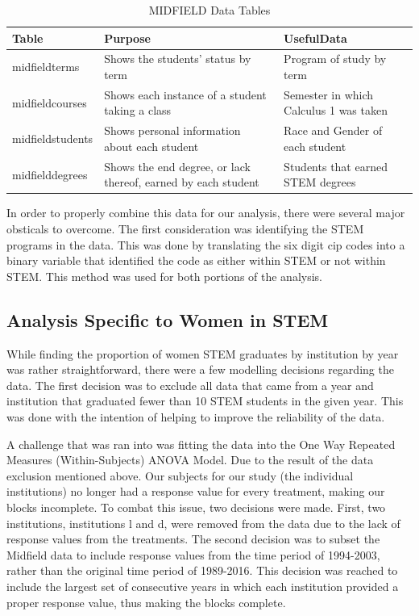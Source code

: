 \documentclass[]{article}
\begin{document}
\begin{table}[H]

\caption{\label{tab:midtables}MIDFIELD Data Tables}
\centering
\fontsize{12}{14}\selectfont
\begin{tabular}[t]{>{\raggedright\arraybackslash}p{1.1in}|>{\centering\arraybackslash}p{2.5in}|>{\centering\arraybackslash}p{2.5in}}
\hline
Table & Purpose & UsefulData\\
\hline
midfieldterms & Shows the students' status by term & Program of study by term\\
\hline
midfieldcourses & Shows each instance of a student taking a class & Semester in which Calculus 1 was taken\\
\hline
midfieldstudents & Shows personal information about each student & Race and Gender of each student\\
\hline
midfielddegrees & Shows the end degree, or lack thereof, earned by each student & Students that earned STEM degrees\\
\hline
\end{tabular}
\end{table}

In order to properly combine this data for our analysis, there were
several major obsticals to overcome. The first consideration was
identifying the STEM programs in the data. This was done by translating
the six digit cip codes into a binary variable that identified the code
as either within STEM or not within STEM. \cite{cip6} This method was
used for both portions of the analysis.

\subsection{Analysis Specific to Women in
STEM}\label{analysis-specific-to-women-in-stem}

While finding the proportion of women STEM graduates by institution by
year was rather straightforward, there were a few modelling decisions
regarding the data. The first decision was to exclude all data that came
from a year and institution that graduated fewer than 10 STEM students
in the given year. This was done with the intention of helping to
improve the reliability of the data.

A challenge that was ran into was fitting the data into the One Way
Repeated Measures (Within-Subjects) ANOVA Model. Due to the result of
the data exclusion mentioned above. Our subjects for our study (the
individual institutions) no longer had a response value for every
treatment, making our blocks incomplete. To combat this issue, two
decisions were made. First, two institutions, institutions l and d, were
removed from the data due to the lack of response values from the
treatments. The second decision was to subset the Midfield data to
include response values from the time period of 1994-2003, rather than
the original time period of 1989-2016. This decision was reached to
include the largest set of consecutive years in which each institution
provided a proper response value, thus making the blocks complete.
\end{document}
